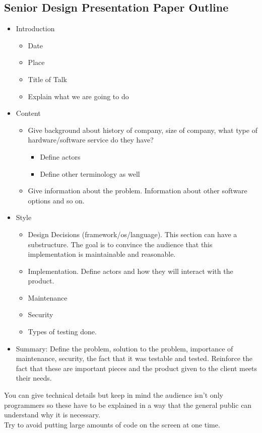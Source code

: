 \documentclass{report}
\begin{document}
\subsection{Senior Design Presentation Paper Outline}
\begin{itemize}
\item Introduction
	\begin{itemize}
	\item Date
	\item Place
	\item Title of Talk
	\item Explain what we are going to do
	\end{itemize}
\item Content
	\begin{itemize}
	\item Give background about history of company, size of company, what type of hardware/software service do they have?
		\begin{itemize}
		\item Define actors
		\item Define other terminology as well
		\end{itemize}
	\item Give information about the problem. Information about other software options and so on.
	\end{itemize}
\item Style
	\begin{itemize}
	\item Design Decisions (framework/os/language). This section can have a substructure. The goal is to convince the audience that this implementation is maintainable and reasonable.
	\item Implementation. Define actors and how they will interact with the product.
	\item Maintenance
	\item Security
	\item Types of testing done.
	\end{itemize}
\item Summary: Define the problem, solution to the problem, importance of maintenance, security, the fact that it was testable and tested. Reinforce the fact that these are important pieces and the product given to the client meets their needs.
\end{itemize}
You can give technical details but keep in mind the audience isn't only programmers so these have to be explained in a way that the general public can understand why it is necessary.\\
Try to avoid putting large amounts of code on the screen at one time.\\
\end{document}
